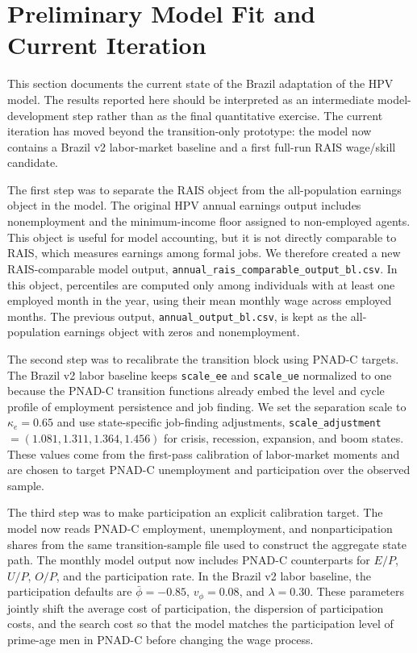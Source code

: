 \documentclass[12pt]{article}
\begin{document}
	\section{Preliminary Model Fit and Current Iteration} \label{sec:preliminary-fit}

	This section documents the current state of the Brazil adaptation of the HPV model. The results reported here should be interpreted as an intermediate model-development step rather than as the final quantitative exercise. The current iteration has moved beyond the transition-only prototype: the model now contains a Brazil v2 labor-market baseline and a first full-run RAIS wage/skill candidate.

	The first step was to separate the RAIS object from the all-population earnings object in the model. The original HPV annual earnings output includes nonemployment and the minimum-income floor assigned to non-employed agents. This object is useful for model accounting, but it is not directly comparable to RAIS, which measures earnings among formal jobs. We therefore created a new RAIS-comparable model output, \texttt{annual\_rais\_comparable\_output\_bl.csv}. In this object, percentiles are computed only among individuals with at least one employed month in the year, using their mean monthly wage across employed months. The previous output, \texttt{annual\_output\_bl.csv}, is kept as the all-population earnings object with zeros and nonemployment.

	The second step was to recalibrate the transition block using PNAD-C targets. The Brazil v2 labor baseline keeps \texttt{scale\_ee} and \texttt{scale\_ue} normalized to one because the PNAD-C transition functions already embed the level and cycle profile of employment persistence and job finding. We set the separation scale to $\kappa_e=0.65$ and use state-specific job-finding adjustments, \texttt{scale\_adjustment} $=(1.081,1.311,1.364,1.456)$ for crisis, recession, expansion, and boom states. These values come from the first-pass calibration of labor-market moments and are chosen to target PNAD-C unemployment and participation over the observed sample.

	The third step was to make participation an explicit calibration target. The model now reads PNAD-C employment, unemployment, and nonparticipation shares from the same transition-sample file used to construct the aggregate state path. The monthly model output now includes PNAD-C counterparts for $E/P$, $U/P$, $O/P$, and the participation rate. In the Brazil v2 labor baseline, the participation defaults are $\bar{\phi}=-0.85$, $v_{\phi}=0.08$, and $\lambda=0.30$. These parameters jointly shift the average cost of participation, the dispersion of participation costs, and the search cost so that the model matches the participation level of prime-age men in PNAD-C before changing the wage process.
\end{document}
